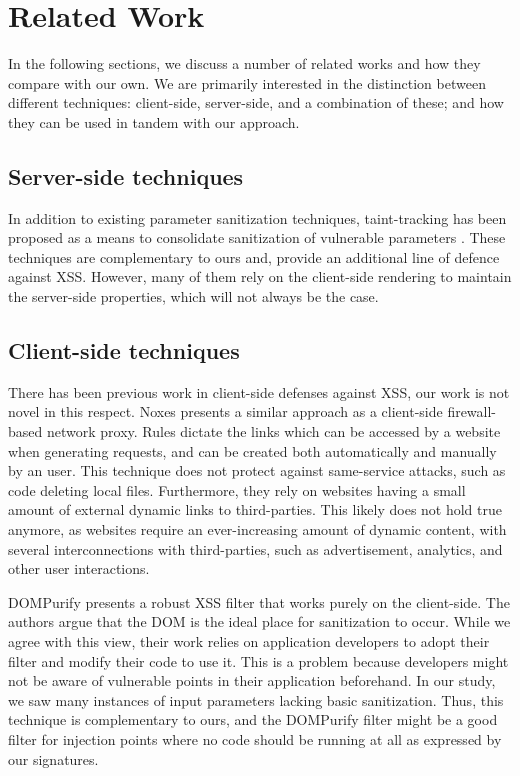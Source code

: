 \section{Related Work}
In the following sections, we discuss a number of related works and how they compare with our own. We are primarily interested in the distinction between different techniques: client-side, server-side, and a combination of these; and how they can be used in tandem with our approach.
\subsection{Server-side techniques} In addition to existing parameter sanitization techniques, taint-tracking has been proposed as a means to consolidate sanitization of vulnerable parameters \cite{Xu:2006:TPE:1267336.1267345,DBLP:conf/sec/Nguyen-TuongGGSE05,Pietraszek:2005:DAI:2146257.2146267,Bisht:2008:XPD:1428322.1428325}. These techniques are complementary to ours and, provide an additional line of defence against XSS. However, many of them rely on the client-side rendering to maintain the server-side properties, which will not always be the case.

\subsection{Client-side techniques} There has been previous work in client-side defenses against XSS, our work is not novel in this respect. Noxes \cite{Kirda:2009:CCS:2639535.2639808} presents a similar approach as a client-side firewall-based network proxy. Rules dictate the links which can be accessed by a website when generating requests, and can be created both automatically and manually by an user. This technique does not protect against same-service attacks, such as code deleting local files. Furthermore, they rely on websites having a small amount of external dynamic links to third-parties. This likely does not hold true anymore, as websites require an ever-increasing amount of dynamic content, with several interconnections with third-parties, such as advertisement, analytics, and other user interactions.

 DOMPurify  \cite{10.1007/978-3-319-66399-9_7} presents a robust XSS filter that works purely on the client-side. The authors argue that the DOM is the ideal place for sanitization to occur. While we agree with this view, their work relies on application developers to adopt their filter and modify their code to use it. This is a problem because developers might not be aware of vulnerable points in their application beforehand. In our study, we saw many instances of input parameters lacking basic sanitization. Thus, this technique is complementary to ours, and the DOMPurify filter might be a good filter for injection points where no code should be running at all as expressed by our signatures. 
 
